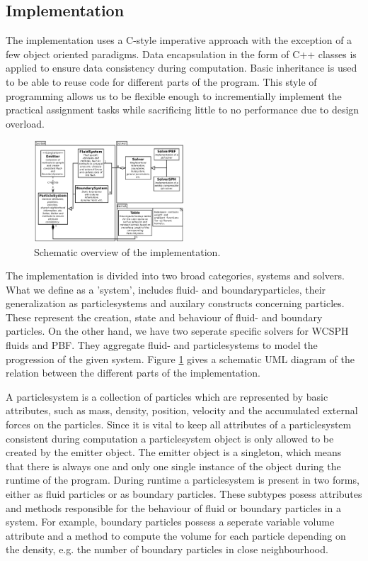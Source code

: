 \documentclass[11pt, letterpaper, twocolumn]{article}
\begin{document}
\subsection{Implementation}
The implementation uses a C-style imperative approach with the exception of a few object oriented paradigms. Data encapsulation in the form of C++ classes is applied to ensure data consistency during computation. Basic inheritance is used to be able to reuse code for different parts of the program. This style of programming allows us to be flexible enough to incrementially implement the practical assignment tasks while sacrificing little to no performance due to design overload.  
\begin{figure}[ht]
    \centering
    \includegraphics[width=0.5\textwidth]{images/system.pdf}
    \caption{Schematic overview of the implementation.}
    \label{fig:systemuml}
\end{figure}
  
The implementation is divided into two broad categories, systems and solvers.
What we define as a 'system', includes fluid- and boundaryparticles, their generalization as particlesystems and auxilary constructs concerning particles. These represent the creation, state and behaviour of fluid- and boundary particles.
On the other hand, we have two seperate specific solvers for WCSPH fluids and PBF. They aggregate fluid- and particlesystems to model the progression of the given system. Figure \ref{fig:systemuml} gives a schematic UML diagram of the relation between the different parts of the implementation.


A particlesystem is a collection of particles which are represented by basic attributes, such as mass, density, position, velocity and the accumulated external forces on the particles. Since it is vital to keep all attributes of a particlesystem consistent during computation a particlesystem object is only allowed to be created by the emitter object. The emitter object is a singleton, which means that there is always one and only one single instance of the object during the runtime of the program. During runtime a particlesystem is present in two forms, either as fluid particles or as boundary particles. These subtypes posess attributes and methods responsible for the behaviour of fluid or boundary particles in a system. For example, boundary particles possess a seperate variable volume attribute and a method to compute the volume for each particle depending on the density, e.g. the number of boundary particles in close neighbourhood.
\end{document}
